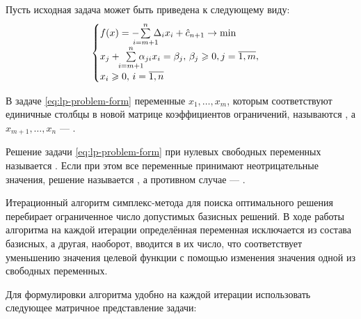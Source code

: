 Пусть исходная задача может быть приведена к следующему виду:
\begin{equation}
  \label{eq:lp-problem-form}
  \begin{cases}
    f(x) = -{\!\!\!\!\suml_{i={m+1}}^n{\!\!\!\!\Delta_{i} x_i}} + \hat{c}_{n+1} \to \min \\
    x_j + \!\! \suml_{i=m+1}^n {\!\!\!\!\alpha_{ji} x_i} = \beta_j,\,
    \beta_j \geq 0, j = \overline{1, m},\\
    x_i \geq 0,\, i = \overline{1, n}
  \end{cases}
\end{equation}

\begin{dfn}
  В задаче \eqref{eq:lp-problem-form} переменные $x_1, \dotsc, x_m$,
  которым соответствуют единичные столбцы в новой матрице
  коэффициентов ограничений, называются , а
  $x_{m+1}, \dotsc, x_n$ — .
\end{dfn}

\begin{dfn}
  Решение задачи \eqref{eq:lp-problem-form} при нулевых свободных
  переменных называется . Если при этом все
  переменные принимают неотрицательные значения, решение называется
  , а противном случае — .
\end{dfn}

Итерационный алгоритм симплекс-метода для поиска оптимального решения
перебирает ограниченное число допустимых базисных решений. В ходе
работы алгоритма на каждой итерации определённая переменная
исключается из состава базисных, а другая, наоборот, вводится в их
число, что соответствует уменьшению значения целевой функции с помощью
изменения значения одной из свободных переменных.

Для формулировки алгоритма удобно на каждой итерации использовать
следующее матричное представление задачи:

